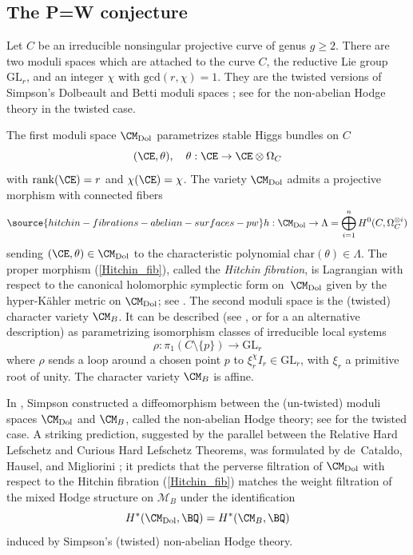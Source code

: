 \subsection{The P=W conjecture}
Let $C$ be an irreducible  nonsingular  projective curve of genus $g \geq 2$. There are two moduli spaces which are attached to the curve $C$, the reductive Lie group $\mathrm{GL}_r$, and an integer $\chi$ with $\mathrm{gcd}(r,\chi)=1$.
They are the twisted versions of Simpson's Dolbeault and Betti moduli spaces \cite{Si1994II}; see \cite{HT1} for  the non-abelian Hodge theory in the twisted  case.


The first moduli space $\CM_{\mathrm{Dol}}$ parametrizes stable Higgs bundles on $C$
\[
(\CE, \theta), \quad \theta: \CE \to \CE \otimes \Omega_C
\]
with $\mathrm{rank}(\CE)=r$ and $\chi(\CE) =\chi$. The variety $\CM_{\mathrm{Dol}}$ admits a projective morphism with connected fibers
\begin{equation}\label{Hitchin_fib}
\source{hitchin-fibrations-abelian-surfaces-pw}
h: \CM_{\mathrm{Dol}} \rightarrow \Lambda = \bigoplus_{i=1}^n H^0(C, \Omega_C^{\otimes i})
\end{equation}
sending $(\CE, \theta) \in \CM_{\mathrm{Dol}}$ to the characteristic polynomial $\mathrm{char}(\theta) \in \Lambda$. The proper morphism (\ref{Hitchin_fib}), called the \emph{Hitchin fibration}, is Lagrangian with respect to the canonical holomorphic symplectic form on~$\CM_{\mathrm{Dol}}$ given by the hyper-K\"ahler metric on $\CM_{\mathrm{Dol}}$; see \cite{Hit1}.
The second moduli space is the  (twisted) character variety $\CM_B$. It  can be described (see \cite{HT1}, or  \cite{Shende} for a an alternative description) as parametrizing isomorphism classes of irreducible local systems
\[
\rho: \pi_1(C \setminus \{p\}) \to \mathrm{GL}_r
\]
where $\rho$ sends a loop around a chosen point $p$ to $\xi^\chi_r I_r \in \mathrm{GL}_r$, with $\xi_r$ a primitive root of unity. The character variety $\CM_B$ is affine.

In \cite{Simp}, Simpson constructed a diffeomorphism between the (un-twisted) moduli spaces
$\CM_{\mathrm{Dol}}$ and $\CM_B$, called the non-abelian Hodge theory;  see \cite{HT1} for the twisted case.  A striking
prediction, suggested by the parallel between the Relative Hard Lefschetz \cite{BBD} and
Curious Hard Lefschetz \cite{HRV} Theorems, was formulated by de~Cataldo, Hausel, and Migliorini \cite{dCHM1}; it predicts that the perverse filtration of $\CM_{\mathrm{Dol}}$ with respect to the Hitchin fibration (\ref{Hitchin_fib}) matches the weight filtration of the mixed Hodge structure on $\mathcal{M}_B$ under the identification
\[
H^\ast(\CM_{\mathrm{Dol}}, \BQ) = H^\ast(\CM_B, \BQ)
\]
induced by Simpson's  (twisted) non-abelian Hodge theory.

